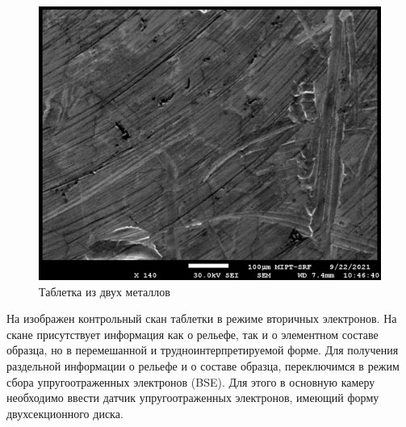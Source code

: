\documentclass[a4paper,12pt]{article}
\theoremstyle{plain} %
\theoremstyle{definition} %
\theoremstyle{remark} %
\newcommand{\picref}[1]{
	\text{рис(\ref{#1})}
}
\begin{document}
\begin{figure}[h!]
	\centering
	\includegraphics[scale=1.3]{pic6.jpg}
	\caption{Таблетка из двух металлов}
	\label{pic6}
\end{figure}
На \picref{pic6} изображен контрольный скан таблетки в режиме вторичных электронов. На скане присутствует информация как о рельефе, так и о элементном составе образца, но в перемешанной и трудноинтерпретируемой форме. Для получения раздельной информации о рельефе и о составе образца, переключимся в режим сбора упругоотраженных электронов (BSE). Для этого в основную камеру необходимо ввести датчик упругоотраженных электронов, имеющий форму двухсекционного диска. 
\end{document}
